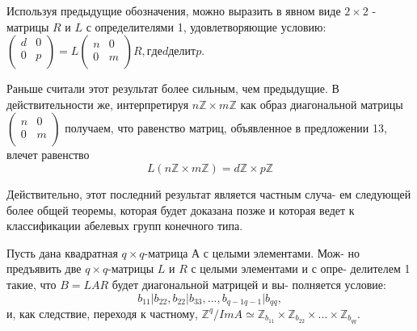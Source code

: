 \begin{predl}
Используя предыдущие обозначения, можно выразить в явном виде \linebreak $2 \times 2$ - матрицы $R$ и $L$ с определителями 1, удовлетворяющие условию: 
${\left( \begin{array}{ccc}
d & 0 \\
0 & p \\
\end{array} \right)} =  L{\left( \begin{array}{ccc}
n & 0 \\
0 & m \\
\end{array} \right)}R, где d делит p.$
\end{predl}
\begin{mynotice}
Раньше считали этот результат более сильным, чем \linebreak предыдущие. В действительности же, интерпретируя $n \mathbb{Z} \times m \mathbb{Z}$ \linebreak как образ диагональной матрицы ${\left( \begin{array}{ccc}
n & 0 \\
0 & m \\
\end{array} \right)}$ получаем, что равенство \linebreak матриц, объявленное в предложении 13, влечет равенство   
$$L(n\mathbb{Z} \times m\mathbb{Z}) = d\mathbb{Z} \times p\mathbb{Z}$$
\end{mynotice}
\newpage
Действительно, этот последний результат является частным случа- \linebreak ем следующей более общей теоремы, которая будет доказана позже и \linebreak которая ведет к классификации абелевых групп конечного типа.  
\begin{thm}
Пусть дана квадратная $q \times q$-матрица $А$ с целыми элементами. Мож- \linebreak но предъявить две $q \times q$-матрицы $L$ и $R$ с целыми элементами и с опре- \linebreak делителем 1 такие, что $B = LAR$ будет диагональной матрицей и вы- \linebreak полняется условие:  
$$b_{11}|b_{22}, b_{22}|b_{33}, ..., b_{q-1 q-1}|b_{qq},$$
и, как следствие, переходя к частному, $\mathbb{Z}^q / ImA \simeq \mathbb{Z}_{b_{11}} \times \mathbb{Z}_{b_{22}} \times ... \times \mathbb{Z}_{b_{qq}}.$
\end{thm}
